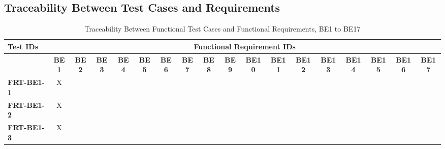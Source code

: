 \documentclass[12pt, titlepage]{article}
\begin{document}
\newpage
\begin{landscape}
	\subsection{Traceability Between Test Cases and Requirements}

	\begin{longtable}{|l|ccccccccccccccccc|}
		\caption{Traceability Between Functional Test Cases and Functional Requirements, BE1 to BE17}                                                                                                                                                                                                                                           \\
		\hline
		\textbf{Test IDs}   & \multicolumn{17}{c|}{\textbf{Functional Requirement IDs}}                                                                                                                                                                                                                                                         \\
		\hline
		~                   & \textbf{BE1}                                              & \textbf{BE2} & \textbf{BE3} & \textbf{BE4} & \textbf{BE5} & \textbf{BE6} & \textbf{BE7} & \textbf{BE8} & \textbf{BE9} & \textbf{BE10} & \textbf{BE11} & \textbf{BE12} & \textbf{BE13} & \textbf{BE14} & \textbf{BE15} & \textbf{BE16} & \textbf{BE17} \\
		\hline
		\textbf{FRT-BE1-1}  & X                                                         & ~            & ~            & ~            & ~            & ~            & ~            & ~            & ~            & ~             & ~             & ~             & ~             & ~             & ~             & ~             & ~             \\
		\textbf{FRT-BE1-2}  & X                                                         & ~            & ~            & ~            & ~            & ~            & ~            & ~            & ~            & ~             & ~             & ~             & ~             & ~             & ~             & ~             & ~             \\
		\textbf{FRT-BE1-3}  & X                                                         & ~            & ~            & ~            & ~            & ~            & ~            & ~            & ~            & ~             & ~             & ~             & ~             & ~             & ~             & ~             & ~             \\

\end{longtable}
\end{landscape}
\end{document}
